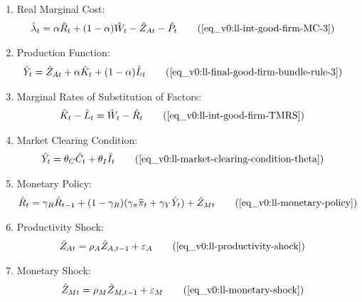 \documentclass[../thesis.tex]{subfiles}
\begin{document}
{\begin{itemize}
\begin{enumerate}
				\item Real Marginal Cost:
				\begin{align}
					\hat{\lambda}_t &= \alpha \hat{R}_t + (1- \alpha) \hat{W}_t - \hat{Z}_{At} - \hat{P}_t \tag{\ref{eq_v0:ll-int-good-firm-MC-3}}
				\end{align}
				
				\item Production Function:
				\begin{align}
					\hat{Y}_t &= \hat{Z}_{At} + \alpha \hat{K}_t + (1-\alpha) \hat{L}_t \tag{\ref{eq_v0:ll-final-good-firm-bundle-rule-3}}
				\end{align}
				
				
				\item Marginal Rates of Substitution of Factors:
				\begin{align}
					\hat{K}_t - \hat{L}_t &= \hat{W}_t - \hat{R}_t \tag{\ref{eq_v0:ll-int-good-firm-TMRS}}
				\end{align}
				
				\item Market Clearing Condition:
				\begin{align}
					\hat{Y}_t &= \theta_C \hat{C}_t + \theta_I \hat{I}_t 
					\tag{\ref{eq_v0:ll-market-clearing-condition-theta}}
				\end{align}
				
				\item Monetary Policy:
				\begin{align}
					& \hat{R}_t = \gamma_R \hat{R}_{t-1} + (1-\gamma_R)(\gamma_\pi \widetilde{\pi}_t + \gamma_Y \hat{Y}_t) + \hat{Z}_{Mt} \tag{\ref{eq_v0:ll-monetary-policy}}
				\end{align}
				
				\item Productivity Shock:
				\begin{align}
					\hat{Z}_{At} &= \rho_A \hat{Z}_{A,t-1} + \varepsilon_{A} \tag{\ref{eq_v0:ll-productivity-shock}}
				\end{align}
				
				\item Monetary Shock:
				\begin{align}
					\hat{Z}_{Mt} &= \rho_M \hat{Z}_{M,t-1} + \varepsilon_{M} \tag{\ref{eq_v0:ll-monetary-shock}}
				\end{align}
				
			\end{enumerate}
			
		\end{itemize}
		
	} %
\end{document}
